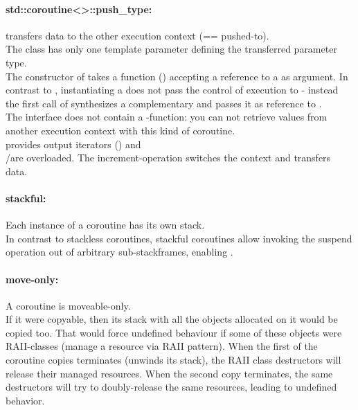 \paragraph*{std::coroutine<>::push\_type:}
transfers data to the other execution context (== pushed-to).\\
The class has only one template parameter defining the transferred parameter
type.\\
The constructor of \pushcoro takes a function (\corofunction) accepting a
reference to a \pullcoro as argument. In contrast to \pullcoro, instantiating a
\pushcoro does not pass the control of execution to \corofunction{ }- instead
the first call of \pushcoroop synthesizes a complementary \pullcoro and passes
it as reference to \corofunction.\\
\newline
The interface does not contain a \get-function: you can not retrieve
values from another execution context with this kind of coroutine.\\
\newline
\pushcoro provides output iterators (\pushcoroiterator) and\\
\bgin/\ed are overloaded. The increment-operation switches the context and
transfers data.

\paragraph*{stackful:}
Each instance of a coroutine has its own stack.\\
\newline
In contrast to stackless coroutines, stackful coroutines allow invoking the
suspend operation out of arbitrary sub-stackframes, enabling \escreops.

\paragraph*{move-only:}
A coroutine is moveable-only.\\
\newline
If it were copyable, then its stack with all the objects allocated on it
would be copied too. That would force undefined behaviour if some of these objects
were RAII-classes (manage a resource via RAII pattern). When the first of the
coroutine copies terminates (unwinds its stack), the RAII class destructors will
release their managed resources. When the second copy terminates, the same
destructors will try to doubly-release the same resources, leading to undefined
behavior.

